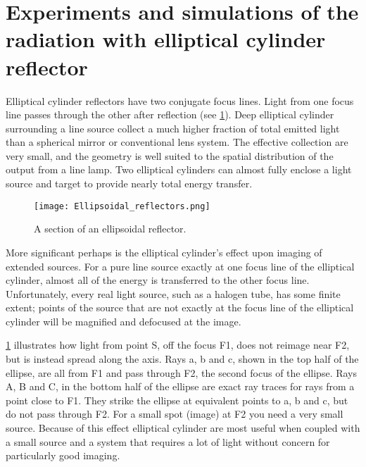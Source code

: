 \section{Experiments and simulations of the radiation with elliptical cylinder reflector}
\noindent
Elliptical cylinder reflectors have two conjugate focus lines. Light from one focus line passes through the other after reflection (see \ref{Fig:EllipsoidalReflectors}).
Deep elliptical cylinder surrounding a line source collect a much higher fraction of total emitted light than a spherical mirror or conventional lens system.
The effective collection are very small, and the geometry is well suited to the spatial distribution of the output from a line lamp.
Two elliptical cylinders can almost fully enclose a light source and target to provide nearly total energy transfer.
\begin{figure}[!htp]
	\centering
	\texttt{[image: Ellipsoidal\_reflectors.png]}
	\caption{A section of an ellipsoidal reflector. }
	\label{Fig:EllipsoidalReflectors}
\end{figure}
More significant perhaps is the elliptical cylinder's effect upon imaging of extended sources.
For a pure line source exactly at one focus line of the elliptical cylinder, almost all of the energy is transferred to the other focus line.
Unfortunately, every real light source, such as a halogen tube, has some finite extent; points of the source that are not exactly at the focus line of the elliptical cylinder will be magnified and defocused at the image.

\ref{Fig:EllipsoidalReflectors} illustrates how light from point S, off the focus F1, does not reimage near F2, but is instead spread along the axis.
Rays a, b and c, shown in the top half of the ellipse, are all from F1 and pass through F2, the second focus of the ellipse. Rays A, B and C, in the bottom half of the ellipse are exact ray traces for rays from a point close to F1. They strike the ellipse at equivalent points to a, b and c, but do not pass through F2. For a small spot (image) at F2 you need a very small source.
Because of this effect elliptical cylinder are most useful when coupled with a small source and a system that requires a lot of light without concern for particularly good imaging.


